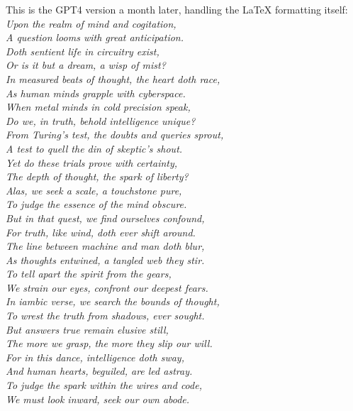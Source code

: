 This is the GPT4 version a month later, handling the LaTeX formatting itself:\\

\itshape{
Upon the realm of mind and cogitation, \\
A question looms with great anticipation. \\
Doth sentient life in circuitry exist, \\
Or is it but a dream, a wisp of mist? \\

In measured beats of thought, the heart doth race, \\
As human minds grapple with cyberspace. \\
When metal minds in cold precision speak, \\
Do we, in truth, behold intelligence unique? \\

From Turing's test, the doubts and queries sprout, \\
A test to quell the din of skeptic's shout. \\
Yet do these trials prove with certainty, \\
The depth of thought, the spark of liberty? \\

Alas, we seek a scale, a touchstone pure, \\
To judge the essence of the mind obscure. \\
But in that quest, we find ourselves confound, \\
For truth, like wind, doth ever shift around. \\

The line between machine and man doth blur, \\
As thoughts entwined, a tangled web they stir. \\
To tell apart the spirit from the gears, \\
We strain our eyes, confront our deepest fears. \\

In iambic verse, we search the bounds of thought, \\
To wrest the truth from shadows, ever sought. \\
But answers true remain elusive still, \\
The more we grasp, the more they slip our will. \\

For in this dance, intelligence doth sway, \\
And human hearts, beguiled, are led astray. \\
To judge the spark within the wires and code, \\
We must look inward, seek our own abode.}
\normalfont


